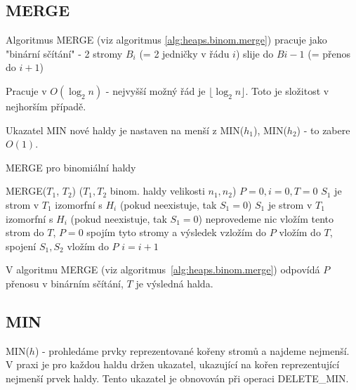\subsection{MERGE}

Algoritmus MERGE (viz algoritmus \ref{alg:heaps.binom.merge}) pracuje jako
"binární sčítání" - 2 stromy $B_i$ (= 2 jedničky v řádu $i$) slije do
$B{i-1}$ (= přenos do $i+1$)

Pracuje v $O(\log_2 n)$ - nejvyšší možný řád je $\lfloor \log_2 n \rfloor$.
Toto je složitost v nejhorším případě.

Ukazatel MIN nové haldy je nastaven na menší z MIN($h_1$), MIN($h_2$) - to
zabere $O(1)$.


\begin{algorithm}[!htb]
\caption{MERGE pro binomiální haldy}
\label{alg:heaps.binom.merge}
\begin{algorithmic}
\STATE MERGE($T_1$, $T_2$)
\STATE ($T_1, T_2$ binom. haldy velikosti $n_1,n_2$)
\STATE $P = 0, i = 0, T = 0$
  \STATE $S_1$ je strom v $T_1$ izomorfní s $H_i$ (pokud neexistuje, tak $S_1=0$)
  \STATE $S_1$ je strom v $T_1$ izomorfní s $H_i$ (pokud neexistuje, tak $S_1=0$)
       \STATE neprovedeme nic
     \ENDIF
        \STATE vložím tento strom do $T$, $P=0$
     \ENDIF
       \STATE spojím tyto stromy a výsledek vzložím do $P$
     \ENDIF
       \STATE vložím do $T$, spojení $S_1, S_2$ vložím do $P$
     \ENDIF
  \STATE $i = i + 1$
\ENDWHILE
\end{algorithmic}
\end{algorithm}

\begin{pozn}
V algoritmu MERGE (viz algoritmus~\ref{alg:heaps.binom.merge}) 
odpovídá $P$ přenosu v binárním sčítání, $T$ je výsledná halda.
\end{pozn}

\subsection{MIN}

MIN($h$) - prohledáme prvky reprezentované kořeny stromů a najdeme
nejmenší. V praxi je pro každou haldu držen ukazatel, ukazující na kořen
reprezentující nejmenší prvek haldy. Tento ukazatel je obnovován při
operaci DELETE\_MIN.


